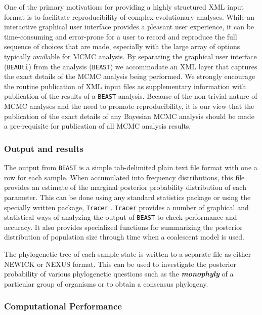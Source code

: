 \documentclass[cup7b, english]{cupbook}
\begin{document}
One of the primary motivations for providing a highly structured XML
input format is to facilitate reproducibility of complex evolutionary
analyses. While an interactive graphical user interface provides a
pleasant user experience, it can be time-consuming and error-prone
for a user to record and reproduce the full sequence of choices that
are made, especially with the large array of options typically available
for MCMC analysis. By separating the graphical user interface (\texttt{BEAUti})
from the analysis (\texttt{BEAST}) we accommodate an XML layer that captures
the exact details of the MCMC analysis being performed. We strongly
encourage the routine publication of XML input files as supplementary
information with publication of the results of a \texttt{BEAST} analysis. Because
of the non-trivial nature of MCMC analyses and the need to promote
reproducibility, it is our view that the publication of the exact
details of any Bayesian MCMC analysis should be made a pre-requisite
for publication of all MCMC analysis results.

\subsubsection{Output and results}

The output from \texttt{BEAST} is a simple tab-delimited plain text file format
with one a row for each sample. When accumulated into frequency distributions,
this file provides an estimate of the marginal posterior probability
distribution of each parameter. This can be done using any standard
statistics package or using the specially written package, \texttt{Tracer}
\cite{RD2003}. \texttt{Tracer} provides a number of graphical and statistical
ways of analyzing the output of \texttt{BEAST} to check performance and accuracy.
It also provides specialized functions for summarizing the posterior distribution of
population size through time when a coalescent model is used.

The phylogenetic tree of each sample state is written to a separate
file as either NEWICK or NEXUS format. This can be used to investigate
the posterior probability of various phylogenetic questions such as
the \textbf{\textit{monophyly}} of a particular group of organisms or to obtain a consensus
phylogeny.

\subsubsection{Computational Performance}
\end{document}
